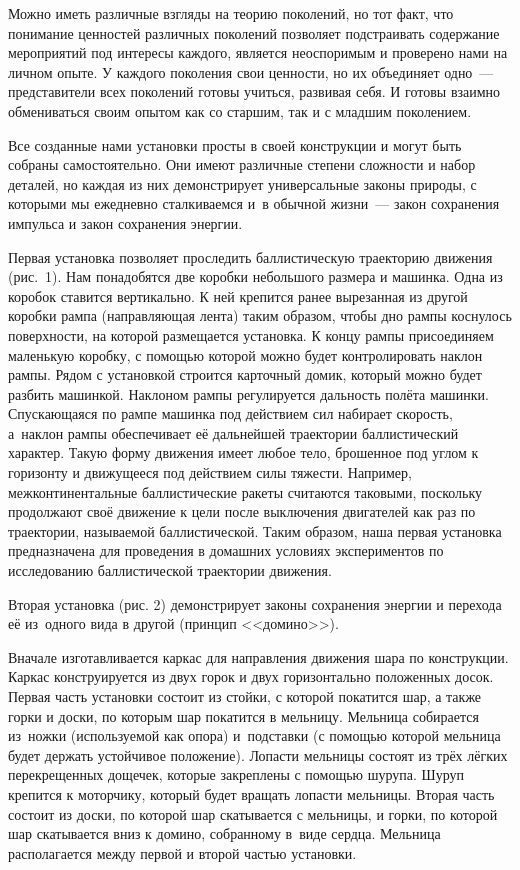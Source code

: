 Можно иметь различные взгляды на теорию поколений, но тот факт, что понимание ценностей различных поколений позволяет подстраивать содержание мероприятий под интересы каждого, является неоспоримым и проверено нами на личном опыте. У каждого поколения свои ценности, но их объединяет одно~--- представители всех поколений готовы учиться, развивая себя. И готовы взаимно обмениваться своим опытом как со старшим, так и с младшим поколением.

Все созданные нами установки просты в своей конструкции и могут быть собраны самостоятельно. Они имеют различные степени сложности и набор деталей, но каждая из них демонстрирует универсальные законы природы, с которыми мы ежедневно сталкиваемся и~в обычной жизни~--- закон сохранения импульса и закон сохранения энергии.

Первая установка позволяет проследить баллистическую траекторию движения (рис.~1). Нам понадобятся две коробки небольшого размера и машинка. Одна из коробок ставится вертикально. К ней крепится ранее вырезанная из другой коробки рампа (направляющая лента) таким образом, чтобы дно рампы коснулось поверхности, на которой размещается установка.  К концу рампы присоединяем маленькую коробку, с помощью которой можно будет контролировать наклон рампы. Рядом с установкой строится карточный домик, который можно будет разбить машинкой. Наклоном рампы регулируется дальность полёта машинки. Спускающаяся по рампе машинка под действием сил набирает скорость, а~наклон рампы обеспечивает её дальнейшей траектории баллистический характер. Такую форму движения имеет любое тело, брошенное под углом к горизонту и движущееся под действием силы тяжести. Например, межконтинентальные баллистические ракеты считаются таковыми, поскольку продолжают своё движение к цели после выключения двигателей как раз по траектории, называемой баллистической. Таким образом, наша первая установка предназначена для проведения в домашних условиях экспериментов по исследованию баллистической траектории движения.



Вторая установка (рис. 2) демонстрирует законы сохранения энергии и перехода её из~одного вида в другой (принцип <<домино>>).

Вначале изготавливается каркас для направления движения шара по конструкции. Каркас конструируется из двух горок и двух горизонтально положенных досок. Первая часть установки состоит из стойки, с которой покатится шар, а также горки и доски, по которым шар покатится в мельницу. Мельница собирается из~ножки (используемой как опора) и~подставки (с помощью которой мельница будет держать устойчивое положение). Лопасти мельницы состоят из трёх лёгких перекрещенных дощечек, которые закреплены с помощью шурупа. Шуруп крепится к моторчику, который будет вращать лопасти мельницы. Вторая часть состоит из доски, по которой шар скатывается с мельницы, и горки, по которой шар скатывается вниз к домино, собранному в~виде сердца. Мельница располагается между первой и второй частью установки.\enlargethispage{\baselineskip}

